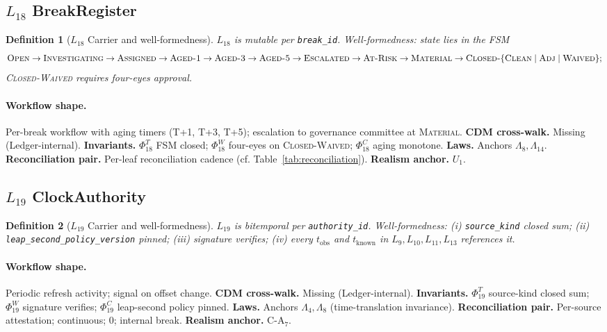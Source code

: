 \documentclass[11pt,a4paper]{article}
\newtheorem{definition}{Definition}[section]
\begin{document}
\subsection{$L_{18}$ BreakRegister}
\label{sec:leaf-l18}

\begin{definition}[$L_{18}$ Carrier and well-formedness]
$L_{18}$ is mutable per \texttt{break\_id}. Well-formedness: state lies in the FSM
\[
\textsc{Open} \to \textsc{Investigating} \to \textsc{Assigned} \to \textsc{Aged-1} \to \textsc{Aged-3} \to \textsc{Aged-5} \to \textsc{Escalated} \to \textsc{At-Risk} \to \textsc{Material} \to \textsc{Closed-}\{\textsc{Clean} \mid \textsc{Adj} \mid \textsc{Waived}\};
\]
\textsc{Closed-Waived} requires four-eyes approval.
\end{definition}

\paragraph{Workflow shape.} Per-break workflow with aging timers (T+1, T+3, T+5); escalation to governance committee at \textsc{Material}. \textbf{CDM cross-walk.} Missing (Ledger-internal). \textbf{Invariants.} $\Phi_{18}^T$ FSM closed; $\Phi_{18}^W$ four-eyes on \textsc{Closed-Waived}; $\Phi_{18}^C$ aging monotone. \textbf{Laws.} Anchors $\Lambda_8, \Lambda_{14}$. \textbf{Reconciliation pair.} Per-leaf reconciliation cadence (cf. Table~\ref{tab:reconciliation}). \textbf{Realism anchor.} $U_1$.

\subsection{$L_{19}$ ClockAuthority}
\label{sec:leaf-l19}

\begin{definition}[$L_{19}$ Carrier and well-formedness]
$L_{19}$ is bitemporal per \texttt{authority\_id}. Well-formedness: (i) \texttt{source\_kind} closed sum; (ii) \texttt{leap\_second\_policy\_version} pinned; (iii) signature verifies; (iv) every $t_{\mathrm{obs}}$ and $t_{\mathrm{known}}$ in $L_9, L_{10}, L_{11}, L_{13}$ references it.
\end{definition}

\paragraph{Workflow shape.} Periodic refresh activity; signal on offset change. \textbf{CDM cross-walk.} Missing (Ledger-internal). \textbf{Invariants.} $\Phi_{19}^T$ source-kind closed sum; $\Phi_{19}^W$ signature verifies; $\Phi_{19}^C$ leap-second policy pinned. \textbf{Laws.} Anchors $\Lambda_4, \Lambda_8$ (time-translation invariance). \textbf{Reconciliation pair.} Per-source attestation; continuous; 0; internal break. \textbf{Realism anchor.} $\mathrm{C\textrm{-}A}_7$.
\end{document}
